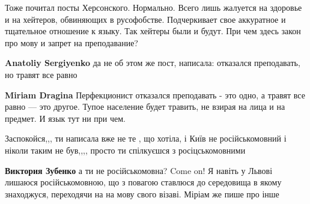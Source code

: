 \begin{itemize}
 

Тоже почитал посты Херсонского. Нормально. Всего лишь жалуется на здоровье и на
хейтеров, обвиняющих в русофобстве. Подчеркивает свое аккуратное и тщательное
отношение к языку. Так хейтеры были и будут. При чем здесь закон про мову и
запрет на преподавание?

\begin{itemize}
 
\textbf{Anatoliy Sergiyenko} да не об этом же пост, написала: отказался преподавать, но травят все равно

 
\textbf{Miriam Dragina} Перфекционист отказался преподавать - это одно, а травят все равно — это другое. Тупое население будет травить, не взирая на лица и на предмет. И язык тут ни при чем.
\end{itemize}

 

Заспокойся,,, ти написала вже не те , що хотіла, і Київ не російськомовний і
ніколи таким не був,,,, просто ти спілкуєшся з росіцськомовними

\begin{itemize}
 

\textbf{Виктория Зубенко} а ти не російськомовна? Come on! Я навіть у Львові лишаюся російськомовною, що з повагою ставлюся до середовища в якому знаходжуся, переходячи на на мову свого візаві. Міріам же пише про інше


\end{itemize}
\end{itemize}
